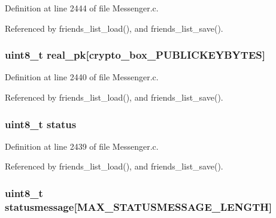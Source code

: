 Definition at line 2444 of file Messenger.\+c.



Referenced by friends\+\_\+list\+\_\+load(), and friends\+\_\+list\+\_\+save().

\hypertarget{struct_s_a_v_e_d___f_r_i_e_n_d_ab42b4c90d81ac99b968c3edd1e21d706}{
\subsubsection[{real\+\_\+pk}]{\setlength{\rightskip}{0pt plus 5cm}uint8\+\_\+t real\+\_\+pk\mbox{[}crypto\+\_\+box\+\_\+\+P\+U\+B\+L\+I\+C\+K\+E\+Y\+B\+Y\+T\+E\+S\mbox{]}}}\label{struct_s_a_v_e_d___f_r_i_e_n_d_ab42b4c90d81ac99b968c3edd1e21d706}


Definition at line 2440 of file Messenger.\+c.



Referenced by friends\+\_\+list\+\_\+load(), and friends\+\_\+list\+\_\+save().

\hypertarget{struct_s_a_v_e_d___f_r_i_e_n_d_ade818037fd6c985038ff29656089758d}{
\subsubsection[{status}]{\setlength{\rightskip}{0pt plus 5cm}uint8\+\_\+t status}}\label{struct_s_a_v_e_d___f_r_i_e_n_d_ade818037fd6c985038ff29656089758d}


Definition at line 2439 of file Messenger.\+c.



Referenced by friends\+\_\+list\+\_\+load(), and friends\+\_\+list\+\_\+save().

\hypertarget{struct_s_a_v_e_d___f_r_i_e_n_d_a8f12612ac1191135a1a5b1cbcbc82852}{
\subsubsection[{statusmessage}]{\setlength{\rightskip}{0pt plus 5cm}uint8\+\_\+t statusmessage\mbox{[}{\bf M\+A\+X\+\_\+\+S\+T\+A\+T\+U\+S\+M\+E\+S\+S\+A\+G\+E\+\_\+\+L\+E\+N\+G\+T\+H}\mbox{]}}}\label{struct_s_a_v_e_d___f_r_i_e_n_d_a8f12612ac1191135a1a5b1cbcbc82852}


